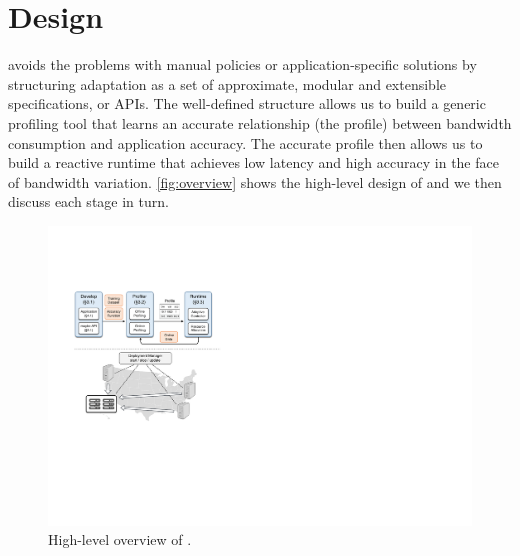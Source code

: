 \section{\sysname{} Design}
\label{sec:system}

\sysname{} avoids the problems with manual policies or application-specific
solutions by structuring adaptation as a set of approximate, modular and
extensible specifications, or APIs. The well-defined structure allows us to
build a generic profiling tool that learns an accurate relationship (the
profile) between bandwidth consumption and application accuracy. The accurate
profile then allows us to build a reactive runtime that achieves low latency and
high accuracy in the face of bandwidth variation. \autoref{fig:overview} shows
the high-level design of \sysname{} and we then discuss each stage in turn.

\begin{figure}
  \centering
  \includegraphics[width=.9\linewidth]{figures/system.pdf}
  \caption{High-level overview of \sysname{}.}
  \label{fig:overview}
\end{figure}





